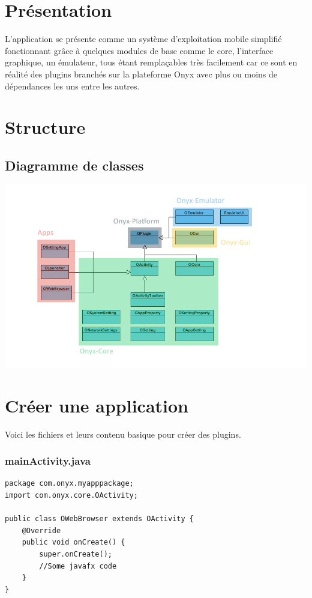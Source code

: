 \section{Présentation}
L'application se présente comme un système d'exploitation mobile simplifié fonctionnant grâce à quelques modules de base comme le core, l'interface graphique, un émulateur, tous étant remplaçables très facilement car ce sont en réalité des plugins branchés sur la plateforme Onyx avec plus ou moins de dépendances les uns entre les autres.

\section{Structure}

\subsection{Diagramme de classes}
\includegraphics[width=20cm]{figures/class_diagram_app.png}

\section{Créer une application}

Voici les fichiers et leurs contenu basique pour créer des plugins.
\subsubsection{mainActivity.java}
\begin{verbatim}
package com.onyx.myapppackage;
import com.onyx.core.OActivity;

public class OWebBrowser extends OActivity {
    @Override
    public void onCreate() {
        super.onCreate();
        //Some javafx code
    }
}
\end{verbatim}

